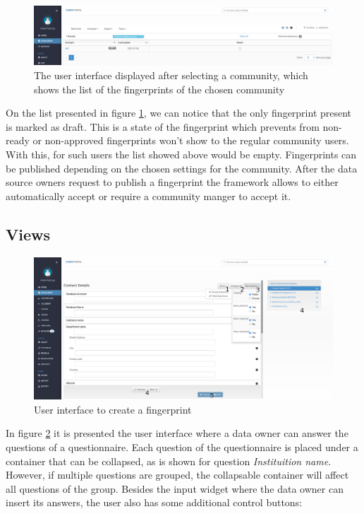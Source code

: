 \begin{figure}[H]
    \center
    \includegraphics[width=\textwidth]{listings}
    \caption{The user interface displayed after selecting a community, which shows the list of the fingerprints of the chosen community}
    \label{fig:listings}
\end{figure}

On the list presented in figure \ref{fig:listings}, we can notice that the only fingerprint present is marked as draft.
This is a state of the fingerprint which prevents from non-ready or non-approved fingerprints won't show to the regular community users.
With this, for such users the list showed above would be empty.
Fingerprints can be published depending on the chosen settings for the community.
After the data source owners request to publish a fingerprint the framework allows to either automatically accept or require a community manger to accept it.

\subsection*{Views}

\begin{figure}[H]
    \center
    \includegraphics[width=\textwidth]{fingerprint-new}
    \caption{User interface to create a fingerprint}
    \label{fig:fingerprint-new}
\end{figure}

In figure \ref{fig:fingerprint-new} it is presented the user interface where a data owner can answer the questions of a questionnaire.
Each question of the questionnaire is placed under a container that can be collapsed, as is shown for question \textit{Instituition name}.
However, if multiple questions are grouped, the collapsable container will affect all questions of the group.
Besides the input widget where the data owner can insert its answers, the user also has some additional control buttons:

